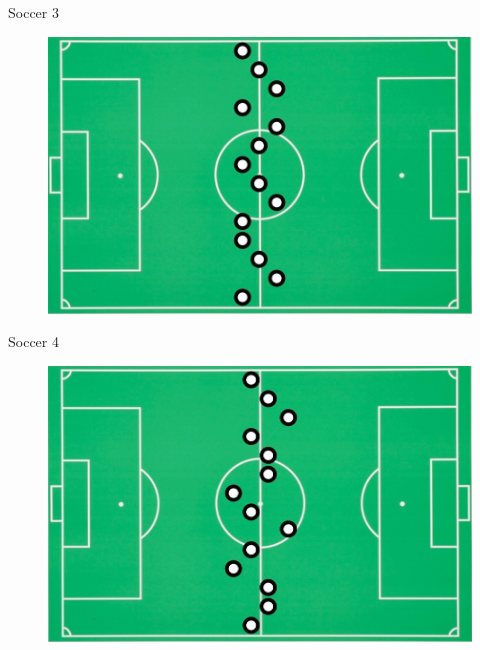 \documentclass[handout]{beamer}
\begin{document}
\begin{frame}{Soccer 3}
 \begin{figure}[h!]
	\centering
	\includegraphics[scale=0.3]{pics/soccer3.png}
\end{figure}


\end{frame}


\begin{frame}{Soccer 4}
 \begin{figure}[h!]
	\centering
	\includegraphics[scale=0.3]{pics/soccer4.png}
\end{figure}


\end{frame}
\end{document}
